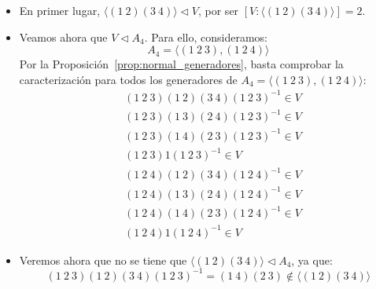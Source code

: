 \begin{ejemplo}
\begin{enumerate}
\begin{figure}[H]
            \end{figure}
            \begin{itemize}
                \item En primer lugar, $\langle (1\ 2)(3\ 4) \rangle \lhd V $, por ser $[V:\langle (1\ 2)(3\ 4) \rangle ] = 2$.
                \item Veamos ahora que $V\lhd A_4$. Para ello, consideramos:
                    \begin{equation*}
                        A_4 = \langle (1\ 2\ 3), (1\ 2\ 4) \rangle 
                    \end{equation*}
                    Por la Proposición~\ref{prop:normal_generadores}, basta comprobar la caracterización para todos los generadores de $A_4 = \langle (1\ 2\ 3), (1\ 2\ 4) \rangle $:
                    \begin{align*}
                        &(1\ 2\ 3)(1\ 2)(3\ 4){(1\ 2\ 3)}^{-1} \in  V \\
                        &(1\ 2\ 3)(1\ 3)(2\ 4){(1\ 2\ 3)}^{-1} \in  V \\
                        &(1\ 2\ 3)(1\ 4)(2\ 3){(1\ 2\ 3)}^{-1} \in  V \\
                        &(1\ 2\ 3)1{(1\ 2\ 3)}^{-1} \in  V \\
                        &(1\ 2\ 4)(1\ 2)(3\ 4){(1\ 2\ 4)}^{-1} \in  V \\
                        &(1\ 2\ 4)(1\ 3)(2\ 4){(1\ 2\ 4)}^{-1} \in  V \\
                        &(1\ 2\ 4)(1\ 4)(2\ 3){(1\ 2\ 4)}^{-1} \in  V \\
                        &(1\ 2\ 4)1{(1\ 2\ 4)}^{-1} \in  V 
                    \end{align*}
                \item Veremos ahora que no se tiene que $\langle (1\ 2)(3\ 4) \rangle\lhd A_4 $, ya que:
                    \begin{equation*}
                        (1\ 2\ 3)(1\ 2)(3\ 4){(1\ 2\ 3)}^{-1} = (1\ 4)(2\ 3)\notin \langle (1\ 2)(3\ 4) \rangle
                    \end{equation*}
            \end{itemize}
    \end{enumerate}
\end{ejemplo}


